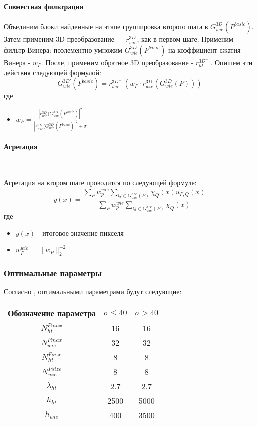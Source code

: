 \paragraph{Совместная фильтрация}
Объединим блоки найденные на этапе группировка второго шага в $G_{wie}^{3D}(P^{basic})$. Затем применим 3D преобразование - - $r_{wie}^{3D}$, как в первом шаге. Применим фильтр Винера: поэлементно умножим $G_{wie}^{3D}(P^{basic})$ на коэффициент сжатия Винера - $w_P$. После, применим обратное 3D преобразование - $r_{ht}^{3D^{-1}}$. Опишем эти действия следующей формулой:
\begin{equation}
G_{wie}^{3D'}(P^{basic}) = r_{wie}^{3D^{-1}}(w_P \cdot r_{wie}^{3D}(G_{wie}^{3D}(P)))
\end{equation}
где
\begin{itemize}
\item  $w_P = \frac{|r_{wie}^{3D}(G_{wie}^{3D}(P^{basic})|^2}{|r_{wie}^{3D}(G_{wie}^{3D}(P^{basic})|^2 + \sigma} $
\end{itemize}
\paragraph{Агрегация}\

Агрегация на втором шаге проводится по следующей формуле:
\begin{equation}
y(x) = \frac{\sum\limits_Pw_p^{wie}\sum\limits_{Q \in G_{wie}^{3D'}(P)}\chi_Q(x)u_{P,Q}(x)}{\sum\limits_Pw_p^{wie}\sum\limits_{Q \in G_{wie}^{3D'}(P)}\chi_Q(x)}
\end{equation}
где
\begin{itemize}
	\item $y(x)$ - итоговое значение пикселя
	\item $w_P^{wie}  = \parallel w_P \parallel_2^{-2}$ 
\end{itemize}

\subsubsection{Оптимальные параметры}
Согласно \cite{bm3d}, оптимальными параметрами будут следующие:

\begin{tabular}{|c|c|c|}
	\hline
	Обозначение параметра & $\sigma \leq 40$ & $\sigma > 40$\\
	\hline
	$N_{ht}^{Pmax}$ & 16 & 16 \\
	\hline
	$N_{wie}^{Pmax}$ & 32 & 32 \\
	\hline
	$N_{ht}^{Psize}$ & 8 & 8 \\
	\hline
	$N_{wie}^{Psize}$ & 8 & 8 \\
	\hline
	$\lambda_{ht}$ & 2.7 & 2.7 \\
	\hline
	$h_{ht}$ & 2500 & 5000 \\
	\hline
	$h_{wie}$ & 400 & 3500 \\ 
	\hline
	
\end{tabular}
